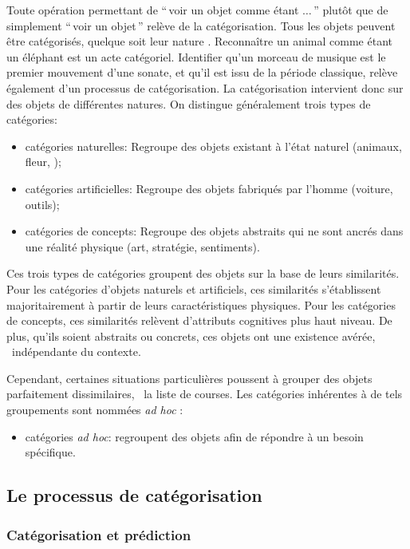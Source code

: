 Toute opération permettant de ``\,voir un objet comme étant $\ldots$\,'' plutôt que de simplement ``\,voir un objet\,'' relève de la catégorisation. Tous les objets peuvent être catégorisés, quelque soit leur nature \citep{goldstone2003concepts}. Reconnaître un animal comme étant un éléphant est un acte catégoriel. Identifier qu'un morceau de musique est le premier mouvement d'une sonate, et qu'il est issu de la période classique, relève également d'un processus de catégorisation. La catégorisation intervient donc sur des objets de différentes natures. On distingue généralement trois types de catégories:

\begin{itemize}
\item catégories naturelles: Regroupe des objets existant à l'état naturel (animaux, fleur, \etc);
\item catégories artificielles: Regroupe des objets fabriqués par l'homme (voiture, outils);
\item catégories de concepts:  Regroupe des objets abstraits qui ne sont ancrés dans une réalité physique (art, stratégie, sentiments).
\end{itemize}

Ces trois types de catégories groupent des objets sur la base de leurs similarités. Pour les catégories d'objets naturels et artificiels, ces similarités s'établissent majoritairement à partir de leurs caractéristiques physiques. Pour les catégories de concepts, ces similarités relèvent d'attributs cognitives plus haut niveau. De plus, qu'ils soient abstraits ou concrets, ces objets ont une existence avérée, \ie~indépendante du contexte.

Cependant, certaines situations particulières poussent à grouper des objets parfaitement dissimilaires, \eg~la liste de courses. Les catégories inhérentes à de tels groupements sont nommées \emph{ad hoc} \citep{barsalou1983ad}:

\begin{itemize}
 \item catégories \emph{ad hoc}:  regroupent des objets afin de répondre à un besoin spécifique.
\end{itemize}

\subsection{Le processus de catégorisation}

\subsubsection{Catégorisation et prédiction}
\label{sec:ch3_categoPred}

